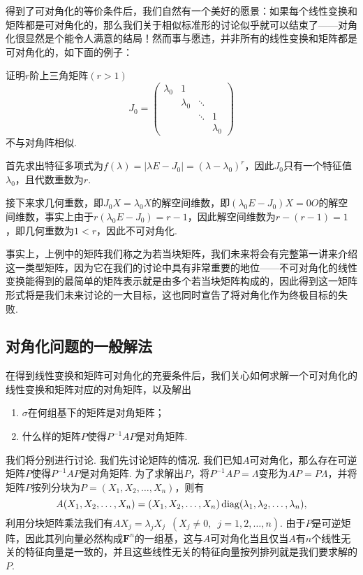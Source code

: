 得到了可对角化的等价条件后，我们自然有一个美好的愿景：如果每个线性变换和矩阵都是可对角化的，那么我们关于相似标准形的讨论似乎就可以结束了——对角化很显然是个能令人满意的结局！然而事与愿违，并非所有的线性变换和矩阵都是可对角化的，如下面的例子：
\begin{example} \label{ex:16:若当块不可对角化}
    证明$r$阶上三角矩阵$(r>1)$
    \[J_0=\begin{pmatrix}
            \lambda_0 & 1         &        &           \\
                      & \lambda_0 & \ddots &           \\
                      &           & \ddots & 1         \\
                      &           &        & \lambda_0
        \end{pmatrix}\]
    不与对角阵相似.
\end{example}

\begin{solution}
    首先求出特征多项式为$f(\lambda)=|\lambda E-J_0|=(\lambda-\lambda_0)^r$，因此$J_0$只有一个特征值$\lambda_0$，且代数重数为$r$.

    接下来求几何重数，即$J_0X=\lambda_0X$的解空间维数，即$(\lambda_0 E-J_0)X=0O$的解空间维数，事实上由于$r(\lambda_0 E-J_0)=r-1$，因此解空间维数为$r-(r-1)=1$，即几何重数为$1<r$，因此不可对角化.
\end{solution}

事实上，上例中的矩阵我们称之为若当块矩阵，我们未来将会有完整第一讲来介绍这一类型矩阵，因为它在我们的讨论中具有非常重要的地位——不可对角化的线性变换能得到的最简单的矩阵表示就是由多个若当块矩阵构成的，因此得到这一矩阵形式将是我们未来讨论的一大目标，这也同时宣告了将对角化作为终极目标的失败.

\subsection{对角化问题的一般解法}

在得到线性变换和矩阵可对角化的充要条件后，我们关心如何求解一个可对角化的线性变换和矩阵对应的对角矩阵，以及解出
\begin{enumerate}
    \item $\sigma$在何组基下的矩阵是对角矩阵；

    \item 什么样的矩阵$P$使得$P^{-1}AP$是对角矩阵.
\end{enumerate}

我们将分别进行讨论. 我们先讨论矩阵的情况. 我们已知$A$可对角化，那么存在可逆矩阵$P$使得$P^{-1}AP$是对角矩阵. 为了求解出$P$，将$P^{-1}AP=\varLambda$变形为$AP=P\varLambda$，并将矩阵$P$按列分块为$P=(X_1,X_2,\ldots,X_n)$，则有
\[A(X_1,X_2,\ldots,X_n)=(X_1,X_2,\ldots,X_n)\operatorname{diag}(\lambda_1,\lambda_2,\ldots,\lambda_n),\]
利用分块矩阵乘法我们有$AX_j=\lambda_jX_j\enspace(X_j\neq 0,\enspace j=1,2,\ldots,n)$. 由于$P$是可逆矩阵，因此其列向量必然构成$\mathbf{F}^n$的一组基，这与$A$可对角化当且仅当$A$有$n$个线性无关的特征向量是一致的，并且这些线性无关的特征向量按列排列就是我们要求解的$P$.


